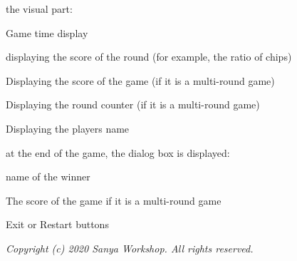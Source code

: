 \begin{DoxyItemize}
\item the visual part\+:
\item Game time display
\item displaying the score of the round (for example, the ratio of chips)
\item Displaying the score of the game (if it is a multi-\/round game)
\item Displaying the round counter (if it is a multi-\/round game)
\item Displaying the player\textquotesingle{}s name
\item at the end of the game, the dialog box is displayed\+:
\item name of the winner
\item The score of the game if it is a multi-\/round game
\item Exit or Restart buttons
\end{DoxyItemize}

{\itshape Copyright (c) 2020 Sanya Workshop. All rights reserved.} 